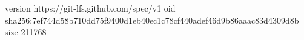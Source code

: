 version https://git-lfs.github.com/spec/v1
oid sha256:7ef744d58b710dd75f9400d1eb40ec1c78cf440adef46d9b86aaac83d4309d8b
size 211768
